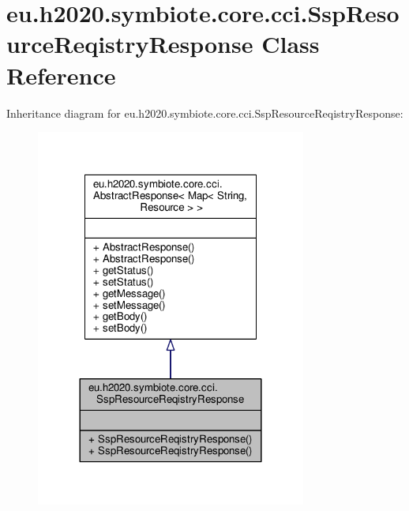 \hypertarget{classeu_1_1h2020_1_1symbiote_1_1core_1_1cci_1_1SspResourceReqistryResponse}{}\section{eu.\+h2020.\+symbiote.\+core.\+cci.\+Ssp\+Resource\+Reqistry\+Response Class Reference}
\label{classeu_1_1h2020_1_1symbiote_1_1core_1_1cci_1_1SspResourceReqistryResponse}


Inheritance diagram for eu.\+h2020.\+symbiote.\+core.\+cci.\+Ssp\+Resource\+Reqistry\+Response\+:
\nopagebreak
\begin{figure}[H]
\begin{center}
\leavevmode
\includegraphics[width=252pt]{classeu_1_1h2020_1_1symbiote_1_1core_1_1cci_1_1SspResourceReqistryResponse__inherit__graph}
\end{center}
\end{figure}


